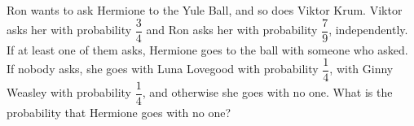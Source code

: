 Ron wants to ask Hermione to the Yule Ball, and so does Viktor Krum. Viktor asks her with probability $\dfrac{3}{4}$ and Ron asks her with probability $\dfrac{7}{9}$, independently. If at least one of them asks, Hermione goes to the ball with someone who asked. If nobody asks, she goes with Luna Lovegood with probability $\dfrac{1}{4}$, with Ginny Weasley with probability $\dfrac{1}{4}$, and otherwise she goes with no one. What is the probability that Hermione goes with no one?
